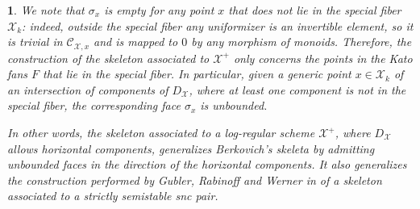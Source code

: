 \documentclass{amsart}%
\numberwithin{equation}{subsection}
\theoremstyle{plain2}
\theoremstyle{definition2}
\theoremstyle{stepstyle}
\theoremstyle{point}
\theoremstyle{subpoint}
\newtheorem{subpoint}[equation]{}%
\newcommand{\spa}[1]{\begin{subpoint}#1\end{subpoint}}           %
\newcommand{\cX}{\ensuremath{\mathscr{X}}}
\newcommand{\caC}{\ensuremath{\mathcal{C}}}
\begin{document}
\spa{ \label{rem points in kato fan and skeleton}
We note that $\sigma_x$ is empty for any point $x$ that does not lie in the special fiber $\cX_k$: indeed, outside the special fiber any uniformizer is an invertible element, so it is trivial in $\caC_{\cX,x}$ and is mapped to $0$ by any morphism of monoids. Therefore, the construction of the skeleton associated to $\cX^+$ only concerns the points in the Kato fans $F$ that lie in the special fiber. In particular, given a generic point $x \in \cX_k$ of an intersection of components of $D_\cX$, where at least one component is not in the special fiber, the corresponding face $\sigma_x$ is unbounded.

In other words, the skeleton associated to a log-regular scheme $\cX^+$, where $D_\cX$ allows horizontal components, generalizes Berkovich's skeleta by admitting unbounded faces in the direction of the horizontal components. It also generalizes the construction performed by Gubler, Rabinoff and Werner in \cite{GublerRabinoffWerner} of a skeleton associated to a strictly semistable snc pair.
}
 
\end{document}
